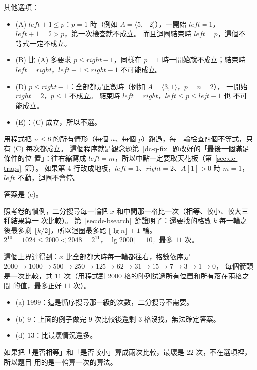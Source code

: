 其他選項：

\begin{itemize}
\item (A) $left + 1 \le p$：$p = 1$ 時（例如 $A = \langle 5, -2 \rangle$），一開始
$left = 1$，$left + 1 = 2 > p$，第一次檢查就不成立。 而且迴圈結束時 $left = p$，這個不
等式一定不成立。
\item (B) 比 (A) 多要求 $p \le right - 1$，同樣在 $p = 1$ 時一開始就不成立；結束時
$left = right$，$left + 1 \le right - 1$ 不可能成立。
\item (D) $p \le right - 1$：全部都是正數時（例如 $A = \langle 3, 1 \rangle$，$p = n = 2$），
一開始 $right = 2$，$p \le 1$ 不成立。 結束時 $left = right$，$left \le p \le left - 1$ 也
不可能成立。
\item (E)：(C) 成立，所以不選。
\end{itemize}

用程式把 $n \le 8$ 的所有情形（每個 $n$、每個 $p$）跑過，每一輪檢查四個不等式，只
有 (C) 每次都成立。 這個程序就是觀念題第~\ref{dc-q-fix}~題改好的「最後一個滿足條件的位
置」：往右縮寫成 $left = m$，所以中點一定要取天花板（第~\ref{sec:dc-traps}~節）。 如果第
4 行改成地板，$left = 1$、$right = 2$、$A[1] > 0$ 時 $m = 1$，$left$ 不動，迴圈不會停。

答案是 (c)。

照考卷的慣例，二分搜尋每一輪把 $x$ 和中間那一格比一次（相等、較小、較大三種結果算一
次比較）。 第~\ref{sec:dc-bsearch}~節證明了：還要找的格數 $k$ 每一輪之後最多剩
$\lfloor k/2 \rfloor$，所以迴圈最多跑 $\lfloor \lg n \rfloor + 1$ 輪。
$2^{10} = 1024 \le 2000 < 2048 = 2^{11}$，$\lfloor \lg 2000 \rfloor = 10$，最多 $11$ 次。

這個上界達得到：$x$ 比全部都大時每一輪都往右，格數依序是
$2000 \to 1000 \to 500 \to 250 \to 125 \to 62 \to 31 \to 15 \to 7 \to 3 \to 1 \to 0$，
每個箭頭是一次比較，共 $11$ 次（用程式對 $2000$ 格的陣列試過所有位置和所有落在兩格之間
的值，最多正好 $11$ 次）。

\begin{itemize}
\item (a) $1999$：這是循序搜尋那一級的次數，二分搜尋不需要。
\item (b) $9$：上面的例子做完 $9$ 次比較後還剩 $3$ 格沒找，無法確定答案。
\item (d) $13$：比最壞情況還多。
\end{itemize}

如果把「是否相等」和「是否較小」算成兩次比較，最壞是 $22$ 次，不在選項裡，所以題目
用的是一輪算一次的算法。

